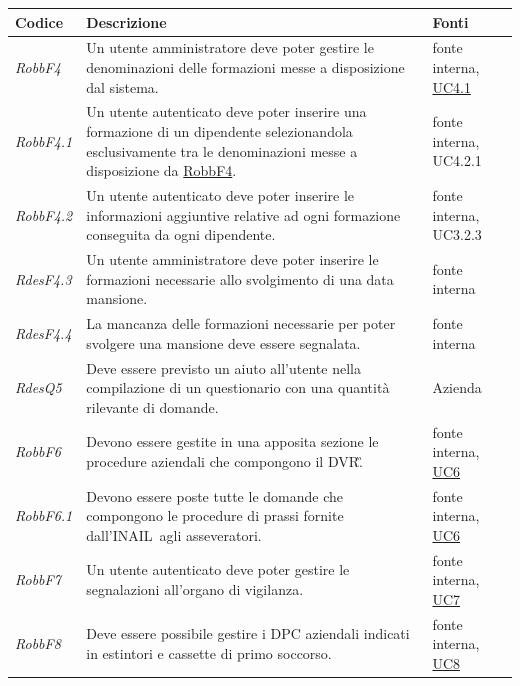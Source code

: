 \begin{flushleft}
	\begin{tabular}{|l{2cm}|l{8cm}|l{2cm}|}
		\hline
		\textbf{Codice} & \textbf{Descrizione} & \textbf{Fonti} \\
		\hline
		\label{RobbF4}
		\textit{RobbF4} & Un utente amministratore deve poter gestire le denominazioni delle formazioni messe a disposizione dal sistema. &  fonte interna, \hyperref[section:UC4_1]{UC4.1}\\
		\hline
		\label{RobbF4.1}
		\textit{RobbF4.1} & Un utente autenticato deve poter inserire una formazione di un dipendente selezionandola esclusivamente tra le denominazioni messe a disposizione da \hyperref[RobbF4]{RobbF4}. &  fonte interna, UC4.2.1 \\
		\hline
		\label{RobbF4.2}
		\textit{RobbF4.2} & Un utente autenticato deve poter inserire le informazioni aggiuntive relative ad ogni formazione conseguita da ogni dipendente. & fonte interna, UC3.2.3\\
		\hline
		\label{RdesF4.3}
		\textit{RdesF4.3} & Un utente amministratore deve poter inserire le formazioni necessarie allo svolgimento di una data mansione. & fonte interna \\
		\hline
		\label{RdesF4.4}
		\textit{RdesF4.4} & La mancanza delle formazioni necessarie per poter svolgere una mansione deve essere segnalata. & fonte interna \\
		\hline
		\label{RobbQ5}
		\textit{RdesQ5} & Deve essere previsto un aiuto all'utente nella compilazione di un  questionario con una quantità rilevante di domande. & Azienda \\
		\hline
		\label{RobbF6}
		\textit{RobbF6} & Devono essere gestite in una apposita sezione le procedure aziendali che compongono il \gls{DVR}\G. & fonte interna, \hyperref[section:UC6]{UC6}\\
		\hline
		\label{RobbF6.1}
		\textit{RobbF6.1} & Devono essere poste tutte le domande che compongono le procedure di prassi fornite dall'\gls{INAIL}\ agli asseveratori. &  fonte interna, \hyperref[section:UC6]{UC6}\\
		\hline
		\label{RdesF7}
		\textit{RobbF7} & Un utente autenticato deve poter gestire le segnalazioni all'organo di vigilanza. & fonte interna,  \hyperref[section:UC7]{UC7}\\
		\hline
		\label{RobbF8}
		\textit{RobbF8} & Deve essere possibile gestire i  \gls{DPC} aziendali indicati in estintori e cassette di primo soccorso. & fonte interna, \hyperref[section:UC8]{UC8}\\

\end{tabular}
\end{flushleft}
